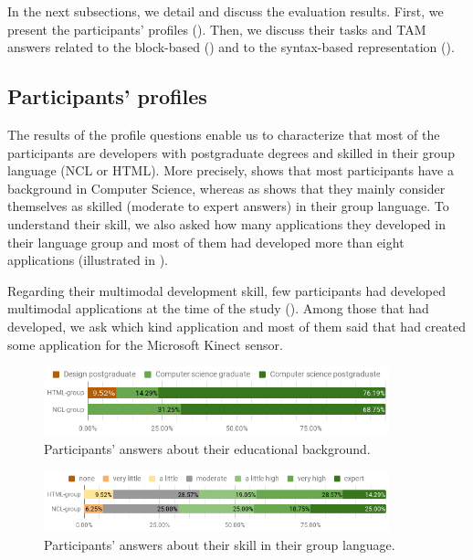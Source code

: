 In the next subsections, we detail and discuss the evaluation results. First, we
present the participants’ profiles ().
Then, we discuss their tasks and TAM answers related to the block-based
() and to the syntax-based representation
().

\subsection{Participants’ profiles }
\label{sec:evaluation:profile-res}

The results of the profile questions enable us to characterize that most of the
participants are developers with postgraduate degrees and skilled in their group
language (NCL or HTML). More precisely,  shows that most
participants have a background in Computer Science, whereas as
 shows that they mainly consider themselves as skilled
(moderate to expert answers) in their group language. To understand their skill,
we also asked how many applications they developed in their language group and
most of them had developed more than eight applications (illustrated in
).

Regarding their multimodal development skill, few participants had developed
multimodal applications at the time of the study (). Among
those that had developed, we ask which kind application and most of them said
that had created some application for the Microsoft Kinect sensor.

\begin{figure}[!ht]
\begin{center}
	\includegraphics[width=10cm, keepaspectratio]{img/img16.png}
	\caption{Participants’ answers about their educational background.}
	\label{fig:profile1}
    \captionvspace
\end{center}
\end{figure}

\begin{figure}[!ht]
\begin{center}
	\includegraphics[width=10cm, keepaspectratio]{img/img17.png}
	\caption{Participants’ answers about their skill in their group language.}
	\label{fig:profile2}
    \captionvspace
\end{center}
\end{figure}

